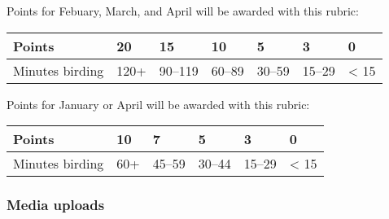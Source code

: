 \documentclass[12pt]{article}
\begin{document}
\begin{itemize}
Points for Febuary, March, and April will be awarded with this rubric:

\begin{tabular}{L{1.5cm}C{1.2cm}C{1.2cm}C{1.2cm}C{1.2cm}C{1.2cm}C{1.2cm}}
\toprule
Points & 20 & 15 & 10 & 5 & 3 & 0 \tabularnewline
\midrule
Minutes birding & 120+ & 90–119 & 60–89 & 30–59 & 15–29 & < 15 \tabularnewline
\bottomrule
\end{tabular}

\bigskip

Points for January or April will be awarded with this rubric:

\begin{tabular}{L{1.5cm}C{1.2cm}C{1.2cm}C{1.2cm}C{1.2cm}C{1.2cm}}
\toprule
Points & 10 & 7 & 5 & 3 & 0 \tabularnewline
\midrule
Minutes birding & 60+ & 45–59 & 30–44 & 15–29 & < 15 \tabularnewline
\bottomrule
\end{tabular}
\end{itemize}

\subsubsection*{Media uploads}
\end{document}
